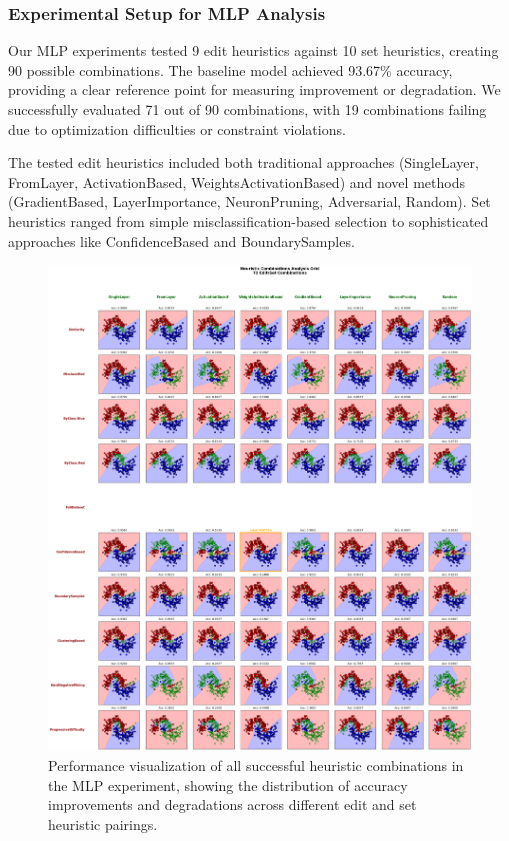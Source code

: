 \documentclass{article}
\begin{document}
\subsubsection{Experimental Setup for MLP Analysis}

Our MLP experiments tested 9 edit heuristics against 10 set heuristics, creating 90 possible combinations. The baseline model achieved 93.67\% accuracy, providing a clear reference point for measuring improvement or degradation. We successfully evaluated 71 out of 90 combinations, with 19 combinations failing due to optimization difficulties or constraint violations.

The tested edit heuristics included both traditional approaches (SingleLayer, FromLayer, ActivationBased, WeightsActivationBased) and novel methods (GradientBased, LayerImportance, NeuronPruning, Adversarial, Random). Set heuristics ranged from simple misclassification-based selection to sophisticated approaches like ConfidenceBased and BoundarySamples.

\begin{figure}[h]
	\centering
	\includegraphics[width=\textwidth]{combinations.png}
	\caption{Performance visualization of all successful heuristic combinations in the MLP experiment, showing the distribution of accuracy improvements and degradations across different edit and set heuristic pairings.}
	\label{fig:mlp_combinations}
\end{figure}
\end{document}
